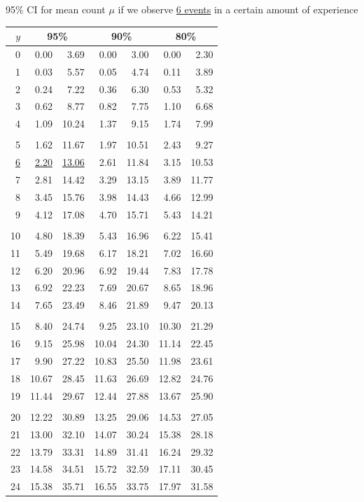 \documentclass{beamer}\usepackage[]{graphicx}\usepackage[]{color}
\begin{document}
\begin{frame}{95\% CI for mean count $\mu$ if we observe \underline{6 events} in a certain amount of experience}
 
 \tiny
 \centering
	\begin{tabular}{|r  | r r  |   r r  |   r r | }
		$y$ & \multicolumn{2}{c}{95\%} & \multicolumn{2}{c}{90\%} & \multicolumn{2}{c}{80\%} \\
		\hline
		0 & 0.00 & 3.69 & 0.00 & 3.00 & 0.00 & 2.30 \\
		1 & 0.03 & 5.57 & 0.05 & 4.74 & 0.11 & 3.89 \\
		2 & 0.24 & 7.22 & 0.36 & 6.30 & 0.53 & 5.32 \\
		3 & 0.62 & 8.77 & 0.82 & 7.75 & 1.10 & 6.68 \\
		4 & 1.09 & 10.24 & 1.37 & 9.15 & 1.74 & 7.99 \\
		& & & & & &  \\
		5 & 1.62 & 11.67 & 1.97 & 10.51 & 2.43 & 9.27 \\
		\underline{6} & \underline{2.20} & \underline{13.06} & 2.61 & 11.84 & 3.15 & 10.53 \\
		7 & 2.81 & 14.42 & 3.29 & 13.15 & 3.89 & 11.77 \\
		8 & 3.45 & 15.76 & 3.98 & 14.43 & 4.66 & 12.99 \\
		9 & 4.12 & 17.08 & 4.70 & 15.71 & 5.43 & 14.21 \\
		& & & & & &  \\
		10 & 4.80 & 18.39 & 5.43 & 16.96 & 6.22 & 15.41 \\
		11 & 5.49 & 19.68 & 6.17 & 18.21 & 7.02 & 16.60 \\
		12 & 6.20 & 20.96 & 6.92 & 19.44 & 7.83 & 17.78 \\
		13 & 6.92 & 22.23 & 7.69 & 20.67 & 8.65 & 18.96 \\
		14 & 7.65 & 23.49 & 8.46 & 21.89 & 9.47 & 20.13 \\
		& & & & & &  \\
		15 & 8.40 & 24.74 & 9.25 & 23.10 & 10.30 & 21.29 \\
		16 & 9.15 & 25.98 & 10.04 & 24.30 & 11.14 & 22.45 \\
		17 & 9.90 & 27.22 & 10.83 & 25.50 & 11.98 & 23.61 \\
		18 & 10.67 & 28.45 & 11.63 & 26.69 & 12.82 & 24.76 \\
		19 & 11.44 & 29.67 & 12.44 & 27.88 & 13.67 & 25.90 \\
		& & & & & &  \\
		20 & 12.22 & 30.89 & 13.25 & 29.06 & 14.53 & 27.05 \\
		21 & 13.00 & 32.10 & 14.07 & 30.24 & 15.38 & 28.18 \\
		22 & 13.79 & 33.31 & 14.89 & 31.41 & 16.24 & 29.32 \\
		23 & 14.58 & 34.51 & 15.72 & 32.59 & 17.11 & 30.45 \\
		24 & 15.38 & 35.71 & 16.55 & 33.75 & 17.97 & 31.58 \\
		\hline
	\end{tabular}

\end{frame}
\end{document}
